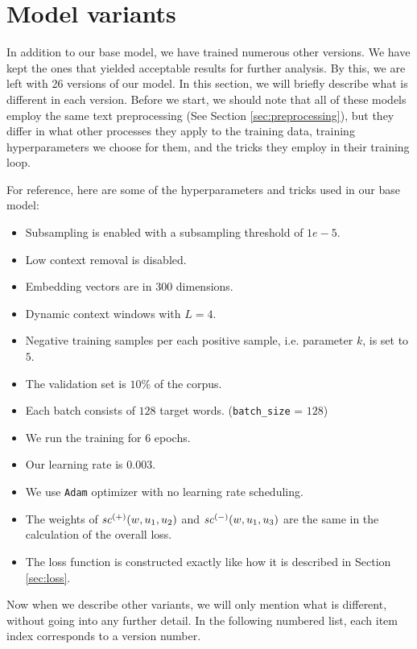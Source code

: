 \section{Model variants}
\label{sec:variants}
In addition to our base model, we have trained numerous other versions. We have kept the ones that yielded acceptable results for further analysis. By this, we are left with 26 versions of our model. In this section, we will briefly describe what is different in each version. Before we start, we should note that all of these models employ the same text preprocessing (See Section \ref{sec:preprocessing}), but they differ in what other processes they apply to the training data, training hyperparameters we choose for them, and the tricks they employ in their training loop.

For reference, here are some of the hyperparameters and tricks used in our base model:
\begin{itemize}
    \item Subsampling is enabled with a subsampling threshold of $1e-5$.
    \item Low context removal is disabled.
    \item Embedding vectors are in $300$ dimensions.
    \item Dynamic context windows with $L=4$.
    \item Negative training samples per each positive sample, i.e. parameter $k$, is set to $5$.
    \item The validation set is $10\%$ of the corpus.
    \item Each batch consists of $128$ target words. (\verb|batch_size| = $128$)
    \item We run the training for $6$ epochs.
    \item Our learning rate is $0.003$.
    \item We use \verb|Adam| optimizer with no learning rate scheduling.
    \item The weights of $\mathit{sc}^{({+})}({w, u_1, u_2})$ and $\mathit{sc}^{({-})}({w, u_1, u_3})$ are the same in the calculation of the overall loss.
    \item The loss function is constructed exactly like how it is described in Section \ref{sec:loss}.
\end{itemize}

Now when we describe other variants, we will only mention what is different, without going into any further detail. In the following numbered list, each item index corresponds to a version number.

